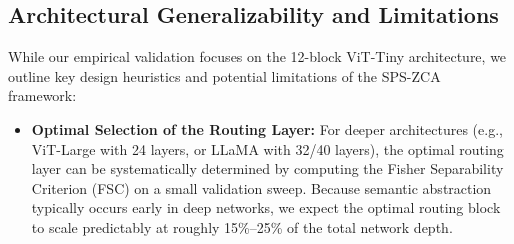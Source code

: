 \subsection{Architectural Generalizability and Limitations}
\label{subsec:generalizability}
While our empirical validation focuses on the 12-block ViT-Tiny architecture, we outline key design heuristics and potential limitations of the SPS-ZCA framework:
\begin{itemize}
    \item \textbf{Optimal Selection of the Routing Layer:} For deeper architectures (e.g., ViT-Large with 24 layers, or LLaMA with 32/40 layers), the optimal routing layer can be systematically determined by computing the Fisher Separability Criterion (FSC) on a small validation sweep.
Because semantic abstraction typically occurs early in deep networks, we expect the optimal routing block to scale predictably at roughly 15\%--25\% of the total network depth.


\end{itemize}
